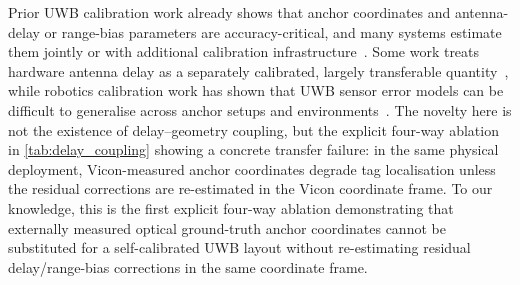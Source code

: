 \documentclass[11pt,a4paper]{article}
\newcommand{\SI}[2]{##1\,\textnormal{##2}}
\newcommand{\milli}{m}
\newcommand{\metre}{m}
\begin{document}

Prior UWB calibration work already shows that anchor coordinates and antenna-delay or range-bias parameters are accuracy-critical, and many systems estimate them jointly or with additional calibration infrastructure~\cite{shah2022node,piavanini2022self,nguyen2025coordinate}.
Some work treats hardware antenna delay as a separately calibrated, largely transferable quantity~\cite{shalaby2023calibration}, while robotics calibration work has shown that UWB sensor error models can be difficult to generalise across anchor setups and environments~\cite{lutz2019visual}.
The novelty here is not the existence of delay--geometry coupling, but the explicit four-way ablation in \cref{tab:delay_coupling} showing a concrete transfer failure: in the same physical deployment, Vicon-measured anchor coordinates degrade tag localisation unless the residual corrections are re-estimated in the Vicon coordinate frame.
To our knowledge, this is the first explicit four-way ablation demonstrating that externally measured optical ground-truth anchor coordinates cannot be substituted for a self-calibrated UWB layout without re-estimating residual delay/range-bias corrections in the same coordinate frame.
\end{document}
